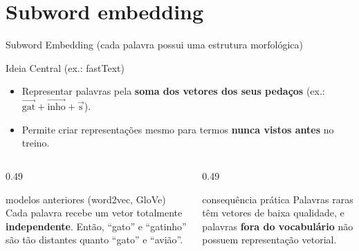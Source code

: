 
\section{Subword embedding}

\begin{frame}{Subword Embedding}
    {\footnotesize\color{gray}(cada palavra possui uma estrutura morfológica)}
    \vspace{0.2cm}
    \begin{exampleblock}{Ideia Central (ex.: fastText)}
        \small
        \begin{itemize}
            \item Representar palavras pela \textbf{soma dos vetores dos seus pedaços} (ex.: $\vec{\text{gat}} + \vec{\text{inho}} + \vec{\text{s}}$). \\[2pt] 
            \item Permite criar representações mesmo para termos \textbf{nunca vistos antes} no treino.
        \end{itemize}
    \end{exampleblock}

    \vspace{0.3cm}
    \begin{columns}[t]
        \begin{column}{0.49\textwidth}
            \begin{alertblock}{modelos anteriores (word2vec, GloVe)}
                \small
                Cada palavra recebe um vetor totalmente \textbf{independente}. Então, ``gato'' e ``gatinho'' são tão distantes quanto ``gato'' e ``avião''.
            \end{alertblock}
        \end{column}
        \begin{column}{0.49\textwidth}
            \begin{alertblock}{consequência prática}
                \small
                Palavras raras têm vetores de baixa qualidade, e palavras \textbf{fora do vocabulário}  não possuem representação vetorial.
            \end{alertblock}
        \end{column}
    \end{columns}


\end{frame}
